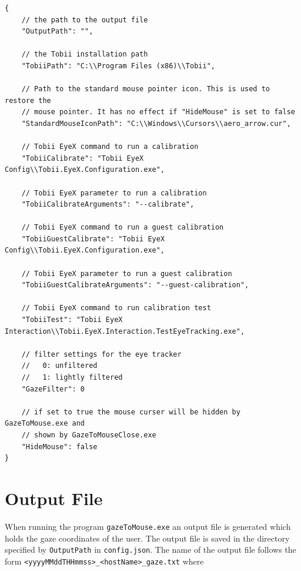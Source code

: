 \documentclass[a4paper,oneside]{book}
\begin{document}
\lstset{language=json}
\begin{lstlisting}[caption={Default configuartion values},label=lst.config]
{
    // the path to the output file
    "OutputPath": "",

    // the Tobii installation path
    "TobiiPath": "C:\\Program Files (x86)\\Tobii",

    // Path to the standard mouse pointer icon. This is used to restore the
    // mouse pointer. It has no effect if "HideMouse" is set to false
    "StandardMouseIconPath": "C:\\Windows\\Cursors\\aero_arrow.cur",

    // Tobii EyeX command to run a calibration
    "TobiiCalibrate": "Tobii EyeX Config\\Tobii.EyeX.Configuration.exe",

    // Tobii EyeX parameter to run a calibration
    "TobiiCalibrateArguments": "--calibrate",

    // Tobii EyeX command to run a guest calibration
    "TobiiGuestCalibrate": "Tobii EyeX Config\\Tobii.EyeX.Configuration.exe",

    // Tobii EyeX parameter to run a guest calibration
    "TobiiGuestCalibrateArguments": "--guest-calibration",

    // Tobii EyeX command to run calibration test
    "TobiiTest": "Tobii EyeX Interaction\\Tobii.EyeX.Interaction.TestEyeTracking.exe",

    // filter settings for the eye tracker
    //   0: unfiltered
    //   1: lightly filtered
    "GazeFilter": 0

    // if set to true the mouse curser will be hidden by GazeToMouse.exe and
    // shown by GazeToMouseClose.exe
    "HideMouse": false
}
\end{lstlisting}

\section{Output File}
When running the program \texttt{gazeToMouse.exe} an output file is generated which holds the gaze coordinates of the user.
The output file is saved in the directory specified by \texttt{OutputPath} in \texttt{config.json}.
The name of the output file follows the form \texttt{<yyyyMMddTHHmmss>\_<hostName>\_gaze.txt} where
\end{document}
